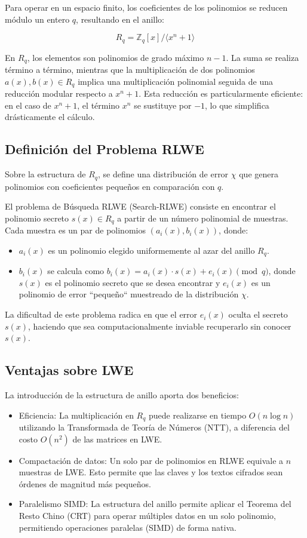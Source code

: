 Para operar en un espacio finito, los coeficientes de los polinomios se reducen módulo un entero $q$, resultando en el anillo:

\[ R_q = \mathbb{Z}_q[x] / \langle x^n + 1 \rangle \]

En $R_q$, los elementos son polinomios de grado máximo $n-1$. La suma se realiza término a término, mientras que la multiplicación de dos polinomios $a(x), b(x) \in R_q$ implica una multiplicación polinomial seguida de una reducción modular respecto a $x^n + 1$. Esta reducción es particularmente eficiente: en el caso de $x^n + 1$, el término $x^n$ se sustituye por $-1$, lo que simplifica drásticamente el cálculo.

\subsection{Definición del Problema RLWE}

Sobre la estructura de $R_q$, se define una distribución de error $\chi$ que genera polinomios con coeficientes pequeños en comparación con $q$.

El problema de Búsqueda RLWE (Search-RLWE) consiste en encontrar el polinomio secreto $s(x) \in R_q$ a partir de un número polinomial de muestras. Cada muestra es un par de polinomios $(a_i(x), b_i(x))$, donde:
\begin{itemize}
    \item $a_i(x)$ es un polinomio elegido uniformemente al azar del anillo $R_q$.
    \item $b_i(x)$ se calcula como $b_i(x) = a_i(x) \cdot s(x) + e_i(x) \pmod{q}$, donde $s(x)$ es el polinomio secreto que se desea encontrar y $e_i(x)$ es un polinomio de error ``pequeño`` muestreado de la distribución $\chi$.
\end{itemize}
La dificultad de este problema radica en que el error $e_i(x)$ oculta el secreto $s(x)$, haciendo que sea computacionalmente inviable recuperarlo sin conocer $s(x)$.

\subsection{Ventajas sobre LWE}

La introducción de la estructura de anillo aporta dos beneficios:

\begin{itemize}
    \item Eficiencia: La multiplicación en $R_q$ puede realizarse en tiempo $O(n \log n)$ utilizando la Transformada de Teoría de Números (NTT), a diferencia del costo $O(n^2)$ de las matrices en LWE.
    \item Compactación de datos: Un solo par de polinomios en RLWE equivale a $n$ muestras de LWE. Esto permite que las claves y los textos cifrados sean órdenes de magnitud más pequeños.
    \item Paralelismo SIMD: La estructura del anillo permite aplicar el Teorema del Resto Chino (CRT) para operar múltiples datos en un solo polinomio, permitiendo operaciones paralelas (SIMD) de forma nativa.
\end{itemize}

